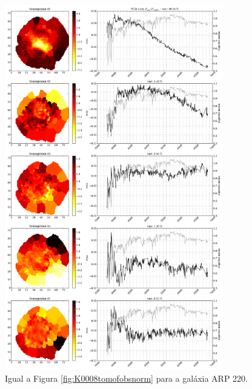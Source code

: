 \begin{figure}
    \includegraphics[width=0.85\textwidth]{figuras/K0802-tomo-obs-norm.pdf}
    \caption[Tomogramas de 1 a 5 para o cubo $F_{obs}$ norm. - ARP 220.]
    {Igual a Figura \ref{fig:K0008tomofobsnorm} para a galáxia ARP 220.}
    \label{fig:K0802tomofobsnorm}
\end{figure}

